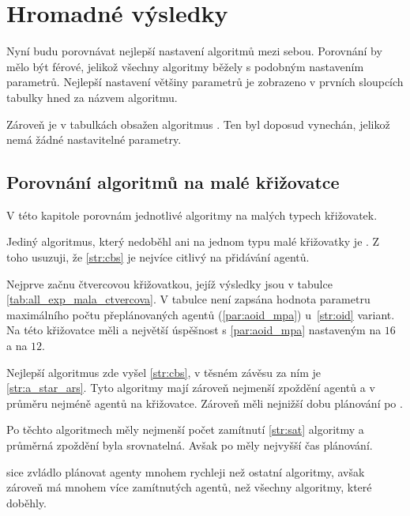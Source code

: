 \section{Hromadné výsledky}\label{sec:hromadne_vysledky}

%

Nyní budu porovnávat nejlepší nastavení algoritmů mezi sebou.
Porovnání by mělo být férové, jelikož všechny algoritmy běžely s podobným nastavením parametrů.
Nejlepší nastavení většiny parametrů je zobrazeno v prvních sloupcích tabulky hned za názvem algoritmu.

Zároveň je v tabulkách obsažen algoritmus .
Ten byl doposud vynechán, jelikož nemá žádné nastavitelné parametry.

\subsection{Porovnání algoritmů na malé křižovatce}\label{subsec:porovnani_algoritmu_na_male_krizovatce}

V této kapitole porovnám jednotlivé algoritmy na malých typech křižovatek.

Jediný algoritmus, který nedoběhl ani na jednom typu malé křižovatky je .
Z toho usuzuji, že \ref{str:cbs} je nejvíce citlivý na přidávání agentů.


Nejprve začnu čtvercovou křižovatkou, jejíž výsledky jsou v tabulce \ref{tab:all_exp_mala_ctvercova}.
V tabulce není zapsána hodnota parametru maximálního počtu přeplánovaných agentů (\ref{par:aoid_mpa}) u~\ref{str:oid} variant.
Na této křižovatce měli  a 
největší úspěšnost s \ref{par:aoid_mpa} nastaveným na $16$ a  na $12$.

Nejlepší algoritmus zde vyšel \ref{str:cbs}, v těsném závěsu za ním je \ref{str:a_star_ars}.
Tyto algoritmy mají zároveň nejmenší zpoždění agentů a v průměru nejméně agentů na křižovatce.
Zároveň měli nejnižší dobu plánování po .

Po těchto algoritmech měly nejmenší počet zamítnutí \ref{str:sat} algoritmy a průměrná zpoždění byla srovnatelná.
Avšak po  měly nejvyšší čas plánování.

 sice zvládlo plánovat agenty mnohem rychleji než ostatní algoritmy,
avšak zároveň má mnohem více zamítnutých agentů, než všechny algoritmy, které doběhly.


